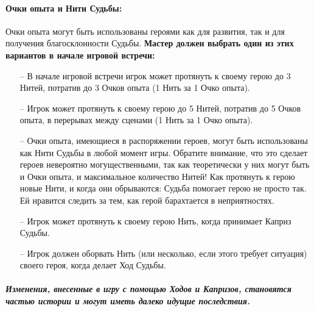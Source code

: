 \paragraph{Очки опыта и Нити Судьбы:} Очки опыта могут быть использованы героями как для развития, так и для получения благосклонности Судьбы. \textbf{Мастер должен выбрать один из этих вариантов в начале игровой встречи:}
\begin{itemize}
\item[--] В начале игровой встречи игрок может протянуть к своему герою до 3 Нитей, потратив до 3 Очков опыта (1 Нить за 1 Очко опыта).
\item[--] Игрок может протянуть к своему герою до 5 Нитей, потратив до 5 Очков опыта, в перерывах между сценами (1 Нить за 1 Очко опыта).
\item[--] Очки опыта, имеющиеся в распоряжении героев, могут быть использованы как Нити Судьбы в любой момент игры. Обратите внимание, что это сделает героев невероятно могущественными, так как теоретически у них могут быть и Очки опыта, и максимальное количество Нитей!
Как протянуть к герою новые Нити, и когда они обрываются:
Судьба помогает герою не просто так. Ей нравится следить за тем, как герой барахтается в неприятностях.
\item[--] Игрок может протянуть к своему герою Нить, когда принимает Каприз Судьбы.
\item[--] Игрок должен оборвать Нить (или несколько, если этого требует ситуация) своего героя, когда делает Ход Судьбы.
\end{itemize}
\paragraph{\textit{Изменения, внесенные в игру с помощью Ходов и Капризов, становятся частью истории и могут иметь далеко идущие последствия.}}


